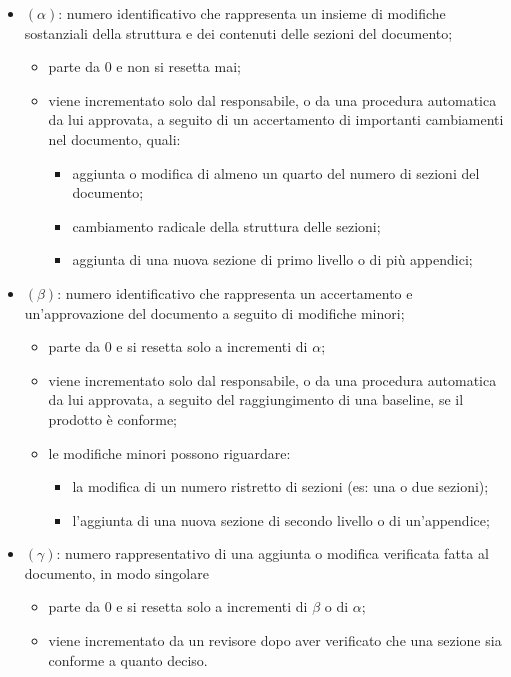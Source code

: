 		\begin{itemize}
			\item \((\alpha)\): numero identificativo che rappresenta un insieme di modifiche sostanziali della struttura e dei contenuti delle sezioni del documento;
				\begin{itemize}
					\item parte da 0 e non si resetta mai;
					\item viene incrementato solo dal responsabile, o da una procedura automatica da lui approvata, a seguito di un accertamento di importanti cambiamenti nel documento, quali: 
					\begin{itemize}
						\item aggiunta o modifica di almeno un quarto del numero di sezioni del documento;
						\item cambiamento radicale della struttura delle sezioni;
						\item aggiunta di una nuova sezione di primo livello o di più appendici;
					\end{itemize}
				\end{itemize}
			\item \((\beta)\): numero identificativo che rappresenta un accertamento e un'approvazione del documento a seguito di modifiche minori;
				\begin{itemize}
					\item parte da 0 e si resetta solo a incrementi di \(\alpha\);
					\item viene incrementato solo dal responsabile, o da una procedura automatica da lui approvata, a seguito del raggiungimento di una baseline, se il prodotto è conforme;
					\item le modifiche minori possono riguardare:
					\begin{itemize}
						\item la modifica di un numero ristretto di sezioni (es: una o due sezioni);
						\item l'aggiunta di una nuova sezione di secondo livello o di un'appendice;
					\end{itemize}
				\end{itemize}
			\item \((\gamma)\): numero rappresentativo di una aggiunta o modifica verificata fatta al documento, in modo singolare
				\begin{itemize}
					\item parte da 0 e si resetta solo a incrementi di \(\beta\) o di \(\alpha\);
					\item viene incrementato da un revisore dopo aver verificato che una sezione sia conforme a quanto deciso.
				\end{itemize}
		\end{itemize}

